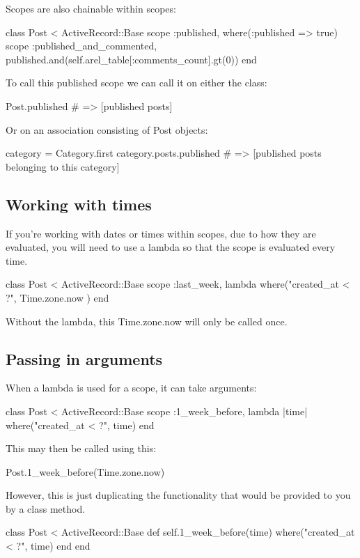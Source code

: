 \documentclass[10pt]{book}
\newenvironment{code}{%
  \scriptsize
    \verbatim
}{%
    \endverbatim
    \newline
}
\begin{document}
Scopes are also chainable within scopes:
\begin{code}
class Post < ActiveRecord::Base
scope :published, where(:published => true)
scope :published_and_commented, 
      published.and(self.arel_table[:comments_count].gt(0))
end
\end{code}

To call this published scope we can call it on either the class:
\begin{code}
Post.published # => [published posts]
\end{code}

Or on an association consisting of Post objects:
\begin{code}
category = Category.first
category.posts.published # => [published posts belonging to this category]
\end{code}

\subsection{ Working with times}

If you’re working with dates or times within scopes, due to how they  are evaluated, you will need to use a lambda so that the scope is  evaluated every time.
\begin{code}
class Post < ActiveRecord::Base
  scope :last_week, lambda { where("created_at < ?", Time.zone.now ) }
end
\end{code}

Without the lambda, this Time.zone.now will only be called once.

\subsection{ Passing in arguments}

When a lambda is used for a scope, it can take arguments:
\begin{code}
class Post < ActiveRecord::Base
  scope :1_week_before, lambda { |time| where("created_at < ?", time) }
end
\end{code}

This may then be called using this:
\begin{code}
Post.1_week_before(Time.zone.now)
\end{code}

However, this is just duplicating the functionality that would be provided to you by a class method.
\begin{code}
class Post < ActiveRecord::Base
  def self.1_week_before(time)
    where("created_at < ?", time)
  end
end
\end{code}
\end{document}
